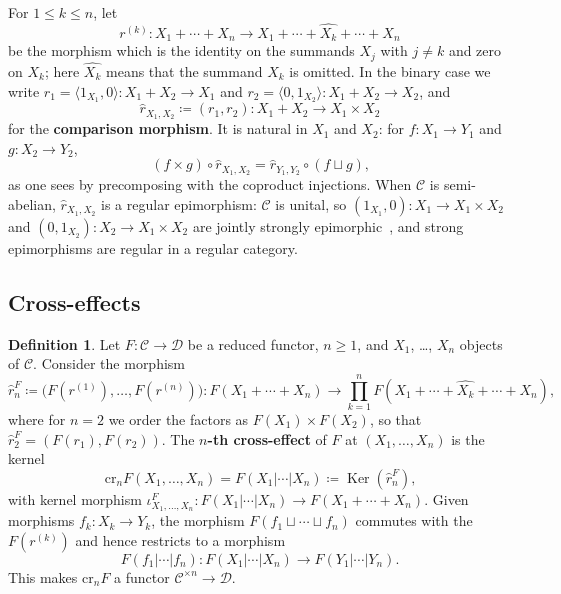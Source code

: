 \documentclass[reqno,a4paper]{amsart}
\theoremstyle{plain}
\theoremstyle{definition}
\newtheorem{definition}[subsection]{Definition}
\newcommand{\defn}{\textbf}
\newcommand{\DefEq}{\coloneq}
\newcommand{\C}{\ensuremath{\mathcal{C}}}
\newcommand{\D}{\ensuremath{\mathcal{D}}}
\newcommand{\cre}{\ensuremath{\mathrm{cr}}}
\DeclareMathOperator{\Ker}{Ker}
\newcommand{\cosum}{\ensuremath{\sqcup}}                   %
\newcommand{\cm}[2]{\ensuremath{\hat{r}_{#1,#2}}}          %
\newcommand{\cmF}[2]{\ensuremath{\hat{r}^{#1}_{#2}}}       %
\begin{document}
For \(1\leq k\leq n\), let
\[
  r^{(k)}\colon X_{1}+\cdots+X_{n}\to X_{1}+\cdots+\widehat{X_{k}}+\cdots+X_{n}
\]
be the morphism which is the identity on the summands \(X_{j}\) with \(j\neq k\) and zero on \(X_{k}\); here \(\widehat{X_{k}}\) means that the summand \(X_{k}\) is omitted. In the binary case we write \(r_{1}=\langle 1_{X_{1}},0\rangle\colon X_{1}+X_{2}\to X_{1}\) and \(r_{2}=\langle 0,1_{X_{2}}\rangle\colon X_{1}+X_{2}\to X_{2}\), and
\[
  \cm{X_{1}}{X_{2}}\DefEq(r_{1},r_{2})\colon X_{1}+X_{2}\to X_{1}\times X_{2}
\]
for the \defn{comparison morphism}. It is natural in \(X_{1}\) and \(X_{2}\): for \(f\colon X_{1}\to Y_{1}\) and \(g\colon X_{2}\to Y_{2}\),
\begin{equation}\label{eq:r-natural}
  (f\times g)\circ\cm{X_{1}}{X_{2}}=\cm{Y_{1}}{Y_{2}}\circ(f\cosum g)\text{,}
\end{equation}
as one sees by precomposing with the coproduct injections. When \(\C\) is semi-abelian, \(\cm{X_{1}}{X_{2}}\) is a regular epimorphism: \(\C\) is unital, so \((1_{X_{1}},0)\colon {X_{1}\to X_{1}\times X_{2}}\) and \((0,1_{X_{2}})\colon X_{2}\to X_{1}\times X_{2}\) are jointly strongly epimorphic~\cite{Borceux-Bourn}, and strong epimorphisms are regular in a regular category.

\subsection{Cross-effects}\label{sec:cross-effects}

\begin{definition}\label{def:cross-effect}
  Let \(F\colon \C\to\D\) be a reduced functor, \(n\geq 1\), and \(X_{1}\), \dots, \(X_{n}\) objects of \(\C\). Consider the morphism
  \[
    \cmF{F}{n}\DefEq\bigl(F(r^{(1)}),\dots,F(r^{(n)})\bigr)\colon F(X_{1}+\cdots+X_{n})\to\prod_{k=1}^{n}F(X_{1}+\cdots+\widehat{X_{k}}+\cdots+X_{n})\text{,}
  \]
  where for \(n=2\) we order the factors as \(F(X_{1})\times F(X_{2})\), so that \(\cmF{F}{2}=(F(r_{1}),F(r_{2}))\). The \defn{\(n\)-th cross-effect} of \(F\) at \((X_{1},\dots,X_{n})\) is the kernel
  \[
    \cre_{n}F(X_{1},\dots,X_{n})=F(X_{1}|\cdots|X_{n})\DefEq\Ker(\cmF{F}{n})\text{,}
  \]
  with kernel morphism \(\iota^{F}_{X_{1},\dots,X_{n}}\colon F(X_{1}|\cdots|X_{n})\to F(X_{1}+\cdots+X_{n})\). Given morphisms \(f_{k}\colon X_{k}\to Y_{k}\), the morphism \(F(f_{1}\cosum\cdots\cosum f_{n})\) commutes with the \(F(r^{(k)})\) and hence restricts to a morphism
  \[
    F(f_{1}|\cdots|f_{n})\colon F(X_{1}|\cdots|X_{n})\to F(Y_{1}|\cdots|Y_{n})\text{.}
  \]
  This makes \(\cre_{n}F\) a functor \(\C^{\times n}\to\D\).
\end{definition}
\end{document}
